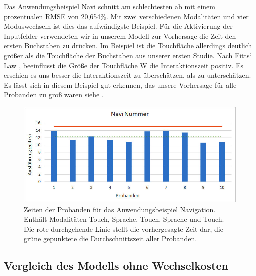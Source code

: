 Das Anwendungsbeispiel Navi schnitt am schlechtesten ab mit einem prozentualen RMSE von 20,654\%. Mit zwei verschiedenen Modalitäten und vier Moduswechseln ist dies das aufwändigste Beispiel. Für die Aktivierung der Inputfelder verwendeten wir in unserem Modell zur Vorhersage die Zeit den ersten Buchstaben zu drücken. Im Beispiel ist die Touchfläche allerdings deutlich größer als die Touchfläche der Buchstaben aus unserer ersten Studie. Nach Fitts` Law \citep{fitts1954information}, \citep{sasangohar2009evaluation}
beeinflusst die Größe der Touchfläche W die Interaktionszeit positiv. Es erschien es uns besser die Interaktionszeit zu überschätzen, als zu unterschätzen. Es lässt sich in diesem Beispiel gut erkennen, das unsere Vorhersage für alle Probanden zu groß waren siehe .
\begin{figure}
	\centering
		\includegraphics[width=1\textwidth]{img/Navi_Times.jpg}
	\caption[Zeiten der Probanden für das Anwendungsbeispiel Navigation.]{Zeiten der Probanden für das Anwendungsbeispiel Navigation. Enthält Modalitäten Touch, Sprache, Touch, Sprache und Touch. Die rote durchgehende Linie stellt die vorhergesagte Zeit dar, die grüne gepunktete die Durchschnittszeit aller Probanden.}
	\label{fig:Navi_Times}
\end{figure}
\subsection{Vergleich des Modells ohne Wechselkosten}

